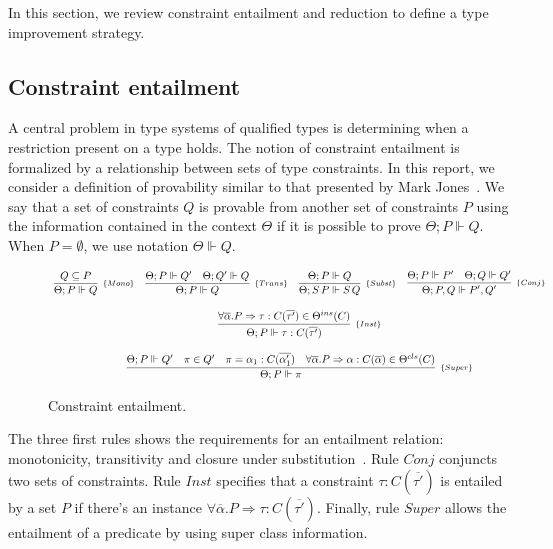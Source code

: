 \documentclass[a4paper, 11pt]{article}
\theoremstyle{definition}
\begin{document}
In this section, we review constraint entailment and reduction
to define a type improvement strategy.

\subsection{Constraint entailment}

A central problem in type systems of qualified types is determining
when a restriction present on a type holds. The notion of
constraint entailment is formalized by a relationship between
sets of type constraints. In this report, we consider a definition of
provability similar to that presented by Mark Jones~\cite{Jones1995}.
We say that a set of constraints $Q$ is provable from another set
of constraints $P$ using the information contained in the
context $\Theta$ if it is possible to prove $\Theta ; P \Vdash Q$.
When $P = \emptyset$, we use notation $\Theta \Vdash Q$.

\begin{figure}[htb]
  \[
    \begin{array}{cccc}
      \infer[_{\{Mono\}}]
            {\Theta ; P \Vdash Q}
            {Q \subseteq P}
      &
      \infer[_{\{Trans\}}]
            {\Theta ; P \Vdash Q}
            {\Theta ; P \Vdash Q'
             &
             \Theta ; Q' \Vdash Q}
      &
      \infer[_{\{Subst\}}]
            {\Theta ; S\,P \Vdash S\,Q}
            {\Theta ; P \Vdash Q}
      &
      \infer[_{\{Conj\}}]
            {\Theta ; P, Q \Vdash P', Q'}
            {\Theta ; P \Vdash P' &
             \Theta ; Q \Vdash Q'}
      \\ \\
      \multicolumn{4}{c}{
        \infer[_{\{Inst\}}]
              {\Theta ; P \Vdash \tau : C(\overline{\tau'}) }
              {\forall \overline{\alpha} .  P \Rightarrow \tau : C(\overline{\tau'}) \in \Theta^{ins}(C)}
      }
      \\ \\
      \multicolumn{4}{c}{
        \infer[_{\{Super\}}]
              {\Theta ; P \Vdash \pi}
              {\Theta ; P \Vdash Q' &
               \pi \in Q' &
               \pi = \alpha_1 : C(\overline{\alpha'_1}) &
               \forall\overline{\alpha}. P \Rightarrow \alpha : C(\overline{\alpha}) \in \Theta^{cls}(C)}
      }
    \end{array}
  \]
  \centering
  \caption{Constraint entailment.}
  \label{fig:constraint-entailment}
\end{figure}
The three first rules shows the requirements for an entailment
relation: monotonicity, transitivity and closure under
substitution~\cite{Jones1995}. Rule $Conj$ conjuncts two sets
of constraints. Rule $Inst$ specifies that a constraint
$\tau : C(\overline{\tau'})$ is entailed by a set $P$ if
there's an instance
$\forall \overline{\alpha} .  P \Rightarrow \tau : C(\overline{\tau'})$.
Finally, rule $Super$ allows the entailment of a predicate
by using super class information.
\end{document}
